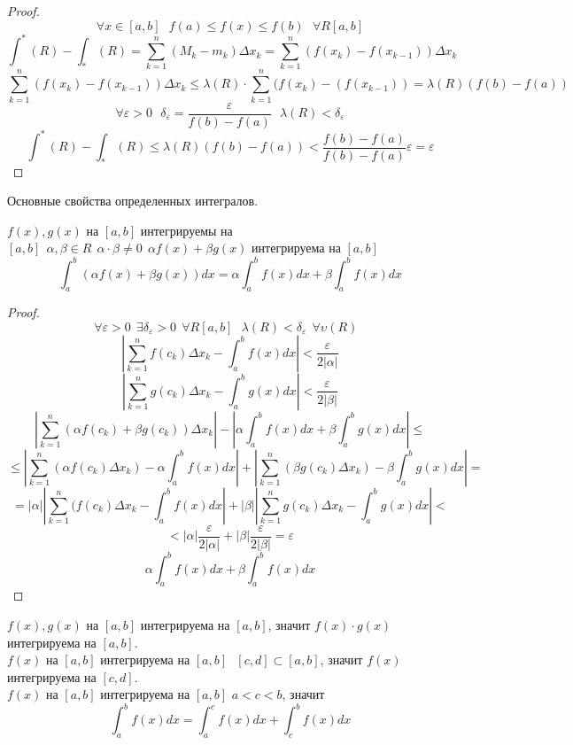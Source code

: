 \begin{proof}
  \[\forall x \in [a,b] ~~~ f(a) \le f(x) \le f(b) ~~~ \forall R[a,b]\]
  \[
    \int^* (R) - \int_* (R) = \sum_{k = 1}^{n} (M_k - m_k) \Delta x_k
    = \sum_{k = 1}^{n} (f(x_k) - f(x_{k-1})) \Delta x_k
  \]
  \[
    \sum_{k = 1}^{n} (f(x_k) - f(x_{k-1})) \Delta x_k \le \lambda(R) \cdot
    \sum_{k = 1}^{n} (f(x_k) - (f(x_{k - 1})) = \lambda (R) (f(b) - f(a))
  \]
  \[
    \forall \varepsilon > 0 ~~~ \delta_\varepsilon = \frac{\varepsilon}{f(b) -
    f(a)} ~~~ \lambda (R) < \delta_\varepsilon
  \]
  \[
  \int^* (R) - \int_* (R) \le \lambda (R) (f(b) - f(a)) <
  \frac{f(b)-f(a)}{f(b)-f(a)} \varepsilon = \varepsilon
  \]
\end{proof}
\begin{title}[\Large]
    Основные свойства определенных интегралов.
\end{title}

 $f(x), g(x)$ на $[a,b]$ интегрируемы на $[a,b] ~~ \alpha , \beta \in R ~~
\alpha \cdot \beta \not= 0 ~~ \alpha f(x) + \beta g(x)$ интегрируема на $[a,b]$
\[
    \int_a^b (\alpha f(x) + \beta g(x))dx = \alpha \int_a^b f(x)dx
    + \beta \int_a^b f(x)dx
\]

\begin{proof}
    \[
        \forall\varepsilon>0 ~~ \exists\delta_{\varepsilon}>0 ~~ \forall R[a,b]
        ~~~ \lambda(R) < \delta_{\varepsilon} ~~ \forall\upsilon(R) ~~~
    \]
    \[
        \left| \sum_{k=1}^{n} f(c_k)\Delta x_k -
        \int_a^b f(x)dx \right| < \frac{\varepsilon}{2|\alpha|}
    \]
    \[
        \left| \sum_{k=1}^{n} g(c_k)\Delta x_k -
        \int_a^b g(x)dx \right| < \frac{\varepsilon}{2|\beta|}
    \]
    \[
        \left| \sum_{k=1}^{n} (\alpha f(c_k) + \beta g(c_k))\Delta x_k \right| -
        \left| \alpha \int_a^b f(x)dx + \beta \int_a^b g(x)dx \right| \le
    \]
    \[
      \le \left| \sum_{k=1}^{n} (\alpha f(c_k) \Delta x_k) -
      \alpha \int_a^b f(x)dx \right| + \left| \sum_{k=1}^{n} (\beta g(c_k)
      \Delta x_k) - \beta \int_a^b g(x)dx \right| =
    \]
    \[
      = |\alpha| \left| \sum_{k=1}^{n} (f(c_k) \Delta x_k -
      \int_a^b f(x)dx \right| + |\beta| \left| \sum_{k=1}^{n} g(c_k)
      \Delta x_k - \int_a^b g(x)dx \right| <
    \]
    \[
        < |\alpha| \frac{\varepsilon}{2|\alpha|} + |\beta|
        \frac{\varepsilon}{2|\beta|} = \varepsilon
    \]
    \[\alpha \int_a^b f(x)dx + \beta \int_a^b f(x)dx\]
\end{proof}

 $f(x),g(x)$ на $[a,b]$ интегрируема на $[a,b]$, значит $f(x) \cdot g(x)$
интегрируема на $[a,b]$.\\
 $f(x)$ на $[a,b]$ интегрируема на $[a,b] ~~~ [c,d] \subset [a,b]$, значит
$f(x)$ интегрируема на $[c,d]$.\\
 $f(x)$ на $[a,b]$ интегрируема на $[a,b]$ $a < c < b$, значит
    \[\int_a^b f(x)dx = \int_a^c f(x)dx + \int_c^b f(x)dx\]

